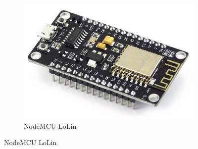 \documentclass{beamer}
\begin{document}
\begin{frame}
\begin{minipage}{\textwidth}
\begin{figure}
\begin{subfigure}[b]{0.25\textwidth}
				\includegraphics[width=\textwidth]{NodeMCUlolin.jpg}
				\caption{NodeMCU LoLin}
				\label{fig:nofdfdde_mfsddfdcudfd}
			\end{subfigure}
			

\end{figure}
\end{minipage}
\end{frame}
\end{document}
